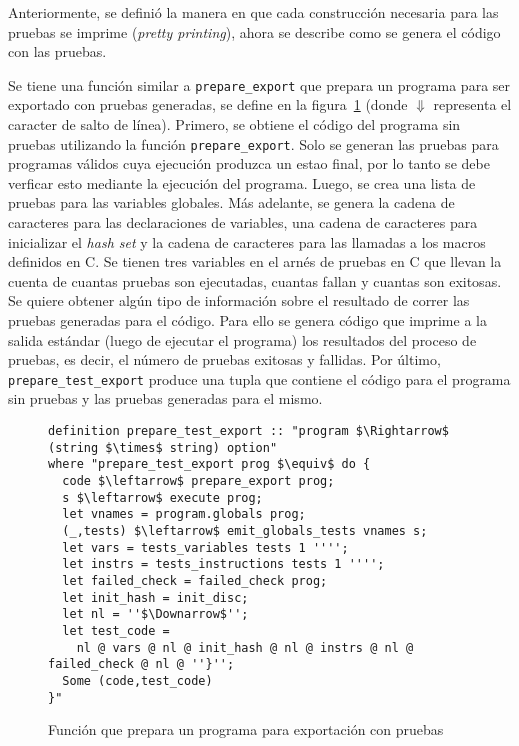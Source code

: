 Anteriormente, se definió la manera en que cada construcción necesaria para las pruebas se imprime (\textit{pretty printing}), ahora se describe como se genera el código con las pruebas.

Se tiene una función similar a \verb|prepare_export| que prepara un programa para ser exportado con pruebas generadas, se define en la figura~\ref{fig:prepare_test_export} (donde $\Downarrow$ representa el caracter de salto de línea).
Primero, se obtiene el código del programa sin pruebas utilizando la función \verb|prepare_export|.
Solo se generan las pruebas para programas válidos cuya ejecución produzca un estao final, por lo tanto se debe verficar esto mediante la ejecución del programa.
Luego, se crea una lista de pruebas para las variables globales.
Más adelante, se genera la cadena de caracteres para las declaraciones de variables, una cadena de caracteres para inicializar el \textit{hash set} y la cadena de caracteres para las llamadas a los macros definidos en C.
Se tienen tres variables en el arnés de pruebas en C que llevan la cuenta de cuantas pruebas son ejecutadas, cuantas fallan y cuantas son exitosas.
Se quiere obtener algún tipo de información sobre el resultado de correr las pruebas generadas para el código.
Para ello se genera código que imprime a la salida estándar (luego de ejecutar el programa) los resultados del proceso de pruebas, es decir, el número de pruebas exitosas y fallidas.
Por último, \verb|prepare_test_export| produce una tupla que contiene el código para el programa sin pruebas y las pruebas generadas para el mismo.

\begin{figure}
\begin{lstlisting}[mathescape=true]
definition prepare_test_export :: "program $\Rightarrow$ (string $\times$ string) option"
where "prepare_test_export prog $\equiv$ do {
  code $\leftarrow$ prepare_export prog;
  s $\leftarrow$ execute prog;
  let vnames = program.globals prog;
  (_,tests) $\leftarrow$ emit_globals_tests vnames s;
  let vars = tests_variables tests 1 '''';
  let instrs = tests_instructions tests 1 '''';
  let failed_check = failed_check prog;
  let init_hash = init_disc;
  let nl = ''$\Downarrow$'';
  let test_code =
    nl @ vars @ nl @ init_hash @ nl @ instrs @ nl @ failed_check @ nl @ ''}'';
  Some (code,test_code)
}"
\end{lstlisting}

\caption{Función que prepara un programa para exportación con pruebas}
\label{fig:prepare_test_export}
\end{figure}


